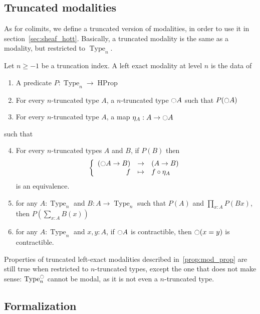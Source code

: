 \documentclass[notfinal]{jfrarticle}
\DeclareMathOperator{\Type}{Type}
\DeclareMathOperator{\HProp}{HProp}
\newcommand{\modal}{\ensuremath{\ocircle}}
\begin{document}
\subsection{Truncated modalities}
\label{ssec:trunc_modalities}

As for colimits, we define a truncated version of modalities, in order
to use it in section~\ref{sec:sheaf_hott}. Basically, a truncated modality
is the same as a modality, but restricted to $\Type_n$. 

\begin{defi}
  \label{def:tr_mod}
  Let $n\geq -1$ be a truncation index. A left exact modality at level
  $n$ is the data of
  \begin{enumerate}
  \item A predicate $P:\Type_n \to \HProp$
  \item For every $n$-truncated type $A$, a $n$-truncated type
    $\modal A$ such that $P(\modal A)$
  \item For every $n$-truncated type $A$, a map $\eta_A:A \to
    \modal A$
  \end{enumerate}
  such that
  \begin{enumerate}
    \setcounter{enumi}{3}
  \item For every $n$-truncated types $A$ and $B$, if $P(B)$ then
    \[\left\{
      \begin{array}{rcl}
        (\modal A \to B) & \to & (A \to B) \\
        f & \mapsto & f \circ \eta_A
      \end{array} \right.\]
    is an equivalence.
  \item for any $A:\Type_n$ and $B:A \to \Type_n$ such that $P(A)$
    and $\prod_{x:A} P(B x)$, then $P\left( \sum_{x:A} B(x)\right)$
  \item for any $A:\Type_n$ and $x,y:A$, if $\modal A$ is
    contractible, then $\modal (x=y)$ is contractible.
  \end{enumerate}
\end{defi}

Properties of truncated left-exact modalities described
in~\ref{prop:mod_prop} are still true when restricted to $n$-truncated
types, except the one that does not make sense: $\Type_n^\modal$
cannot be modal, as it is not even a $n$-truncated type.

\subsection{Formalization}
\label{ssec:mod-formalization}
\end{document}
